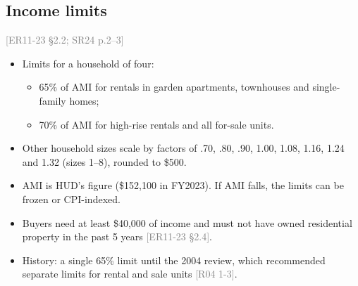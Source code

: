 \documentclass[11pt]{article}
\newcommand{\src}[1]{\textcolor{gray}{\small[#1]}}
\begin{document}
\subsection*{Income limits}
\src{ER11-23 \S2.2; SR24 p.2--3}
\begin{itemize}
  \item Limits for a household of four:
    \begin{itemize}
      \item 65\% of AMI for rentals in garden apartments, townhouses and single-family homes;
      \item 70\% of AMI for high-rise rentals and all for-sale units.
    \end{itemize}
  \item Other household sizes scale by factors of .70, .80, .90, 1.00, 1.08, 1.16, 1.24 and 1.32 (sizes 1--8), rounded to \$500.
  \item AMI is HUD's figure (\$152,100 in FY2023). If AMI falls, the limits can be frozen or CPI-indexed.
  \item Buyers need at least \$40,000 of income and must not have owned residential property in the past 5 years \src{ER11-23 \S2.4}.
  \item History: a single 65\% limit until the 2004 review, which recommended separate limits for rental and sale units \src{R04 1-3}.
\end{itemize}
\end{document}
